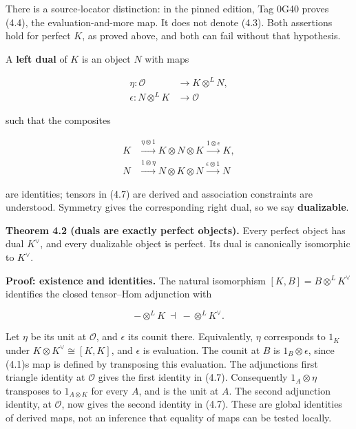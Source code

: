 \documentclass[
  english,
  11pt,
  a4paper,
]{article}
\begin{document}
There is a source-locator distinction: in the pinned edition, Tag 0G40
proves (4.4), the evaluation-and-more map. It does not denote (4.3).
Both assertions hold for perfect \(K\), as proved above, and both can
fail without that hypothesis.

A \textbf{left dual} of \(K\) is an object \(N\) with maps

\[\begin{aligned}
\eta:\mathcal O&\longrightarrow K\otimes^L N,\\
\epsilon:N\otimes^L K&\longrightarrow\mathcal O
\end{aligned}
\tag{4.6}\]

such that the composites

\[\begin{aligned}
K&\xrightarrow{\eta\otimes1}K\otimes N\otimes K
\xrightarrow{1\otimes\epsilon}K,\\
N&\xrightarrow{1\otimes\eta}N\otimes K\otimes N
\xrightarrow{\epsilon\otimes1}N
\end{aligned}
\tag{4.7}\]

are identities; tensors in (4.7) are derived and association constraints
are understood. Symmetry gives the corresponding right dual, so we say
\textbf{dualizable}.

\textbf{Theorem 4.2 (duals are exactly perfect objects).} Every perfect
object has dual \(K^\vee\), and every dualizable object is perfect. Its
dual is canonically isomorphic to \(K^\vee\).

\textbf{Proof: existence and identities.} The natural isomorphism
\([K,B]=B\otimes^L K^\vee\) identifies the closed tensor--Hom adjunction
with

\[-\otimes^L K\ \dashv\ -\otimes^L K^\vee.
\tag{4.8}\]

Let \(\eta\) be its unit at \(\mathcal O\), and \(\epsilon\) its counit
there. Equivalently, \(\eta\) corresponds to \(1_K\) under
\(K\otimes K^\vee\cong[K,K]\), and \(\epsilon\) is evaluation. The
counit at \(B\) is \(1_B\otimes\epsilon\), since (4.1)\textquotesingle s
map is defined by transposing this evaluation. The
adjunction\textquotesingle s first triangle identity at \(\mathcal O\)
gives the first identity in (4.7). Consequently \(1_A\otimes\eta\)
transposes to \(1_{A\otimes K}\) for every \(A\), and is the unit at
\(A\). The second adjunction identity, at \(\mathcal O\), now gives the
second identity in (4.7). These are global identities of derived maps,
not an inference that equality of maps can be tested locally.
\end{document}
